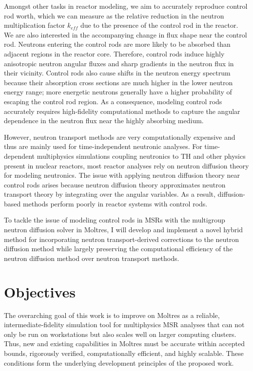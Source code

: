 Amongst other tasks in reactor modeling, we aim to accurately reproduce control rod worth, which we
can measure as the relative reduction
in the neutron multiplication factor $k_{eff}$ due to the presence of the control rod in the
reactor. We are also interested in the accompanying change in flux shape near the
control rod. Neutrons entering the control rods are more likely to be absorbed than
adjacent regions in the reactor core. Therefore, control rods induce highly anisotropic neutron
angular fluxes and sharp gradients in the neutron flux in their vicinity. Control rods also cause
shifts in the neutron energy spectrum because their absorption cross sections are much higher in
the lower neutron energy range; more energetic neutrons generally have a higher probability of
escaping the control rod region. As a consequence, modeling control rods accurately requires
high-fidelity computational methods to capture the angular dependence in the neutron
flux near the highly absorbing medium.

However, neutron transport methods are very computationally expensive and thus are mainly used for
time-independent neutronic analyses. For time-dependent multiphysics simulations coupling
neutronics to \gls{TH} and other physics present in nuclear reactors, most reactor analyses
rely on neutron diffusion theory for modeling neutronics. The issue with applying neutron diffusion
theory near control rods arises because neutron diffusion theory approximates
neutron transport theory by integrating over the angular variables. As a result,
diffusion-based methods perform poorly in reactor systems with control rods.

To tackle the issue of modeling control rods in \glspl{MSR} with the multigroup neutron diffusion
solver in Moltres, I will develop and implement a novel hybrid method for incorporating neutron
transport-derived corrections to the neutron diffusion method while largely preserving the
computational efficiency of the neutron diffusion method over neutron transport methods.

\section{Objectives}

The overarching goal of this work is to improve on Moltres as a reliable, intermediate-fidelity
simulation tool for multiphysics \gls{MSR} analyses that can not only be run on workstations but
also scales well on larger computing clusters. Thus, new and existing capabilities in Moltres must
be accurate within accepted bounds, rigorously verified, computationally efficient, and highly
scalable. These conditions form the underlying development principles of the proposed work.

